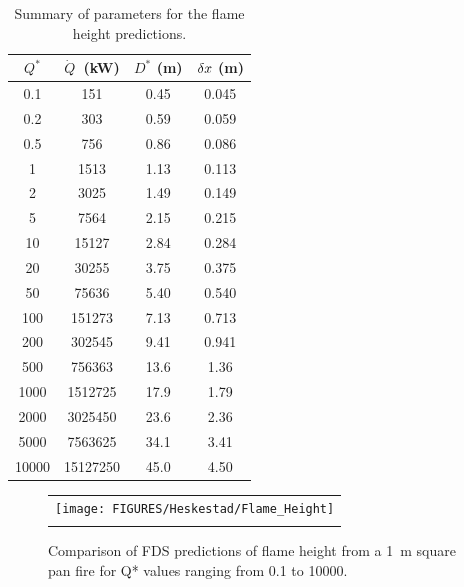 \begin{table}[h!]
\caption{Summary of parameters for the flame height predictions.}
\begin{center}
\begin{tabular}{|c|c|c|c|}
\hline
$Q^*$       & $\dot{Q}$~(kW)   & $D^*$ (m)  & $\delta x$ (m)  \\ \hline \hline
0.1         &   151       & 0.45    &   0.045   \\ \hline
0.2         &   303       & 0.59    &   0.059   \\ \hline
0.5         &   756       & 0.86    &   0.086   \\ \hline
1           &   1513      & 1.13    &   0.113   \\ \hline
2         & 3025      & 1.49    &   0.149   \\ \hline
5         & 7564      & 2.15    &   0.215   \\ \hline
10       &  15127     & 2.84    &   0.284   \\ \hline
20       &  30255     & 3.75    &   0.375   \\ \hline
50       &  75636     & 5.40    &   0.540   \\ \hline
100     &   151273    & 7.13    &   0.713   \\ \hline
200     &   302545    & 9.41    &   0.941   \\ \hline
500     &   756363    & 13.6    &   1.36    \\ \hline
1000    &   1512725 &   17.9    &   1.79    \\ \hline
2000    &   3025450 &   23.6    &   2.36    \\ \hline
5000    &   7563625 &   34.1    &   3.41    \\ \hline
10000   &   15127250    &   45.0    &   4.50    \\ \hline
\end{tabular}
\end{center}
\label{Flame_Height_Parameters}
\end{table}

\newpage

\begin{figure}[p]
\begin{center}
\begin{tabular}{c}
\texttt{[image: FIGURES/Heskestad/Flame\_Height]} \\
\vspace{0.25in} \\
\end{tabular}
\end{center}
\caption[Summary of flame height predictions, Heskestad correlation.]
{Comparison of FDS predictions of flame height from a 1~m square pan fire for Q* values ranging from
0.1 to 10000.}
\label{Flame_Height}
\end{figure}



